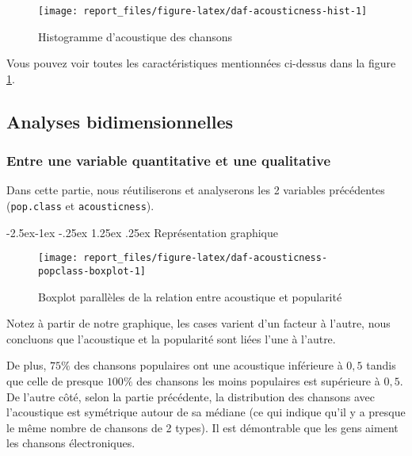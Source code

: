 \documentclass[
  11pt,
  xcolor = usenames,dvipsnames]{article}
\makeatletter
\newcommand{\passthrough}[1]{#1}
\renewcommand\paragraph{\@startsection{paragraph}{4}{\z@}%
        {-2.5ex\@plus -1ex \@minus -.25ex}%
        {1.25ex \@plus .25ex}%
        {\normalfont\normalsize\bfseries}}
\makeatother
\begin{document}
\begin{figure}

{\centering \texttt{[image: report\_files/figure-latex/daf-acousticness-hist-1]} 

}

\caption{Histogramme d'acoustique des chansons}\label{fig:daf-acousticness-hist}
\end{figure}

Vous pouvez voir toutes les caractéristiques mentionnées ci-dessus dans la figure \ref{fig:daf-acousticness-hist}.

\hypertarget{analyses-bidimensionnelles}{%
\subsection{Analyses bidimensionnelles}\label{analyses-bidimensionnelles}}

\hypertarget{entre-une-variable-quantitative-et-une-qualitative}{%
\subsubsection{Entre une variable quantitative et une qualitative}\label{entre-une-variable-quantitative-et-une-qualitative}}

Dans cette partie, nous réutiliserons et analyserons les 2 variables précédentes (\passthrough{\lstinline!pop.class!} et \passthrough{\lstinline!acousticness!}).

\hypertarget{repruxe9sentation-graphique}{%
\paragraph{Représentation graphique}\label{repruxe9sentation-graphique}}

\begin{figure}

{\centering \texttt{[image: report\_files/figure-latex/daf-acousticness-popclass-boxplot-1]} 

}

\caption{Boxplot parallèles de la relation entre acoustique et popularité}\label{fig:daf-acousticness-popclass-boxplot}
\end{figure}

Notez à partir de notre graphique, les cases varient d'un facteur à l'autre,
nous concluons que l'acoustique et la popularité sont liées l'une à l'autre.

De plus, \(75\%\) des chansons populaires ont une acoustique inférieure à \(0,5\) tandis que celle de presque \(100\%\) des chansons les moins populaires est supérieure à \(0,5\).
De l'autre côté, selon la partie précédente, la distribution des chansons avec l'acoustique est symétrique autour de sa médiane (ce qui indique qu'il y a presque le même nombre de chansons de 2 types).
Il est démontrable que les gens aiment les chansons électroniques.
\end{document}
